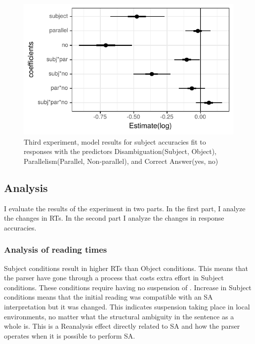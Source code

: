 \begin{knitrout}
\color{fgcolor}\begin{figure}[hbt!]

{\centering \includegraphics[]{experiments/equivalance/report/figure/exp3accuracymodel-1.pdf} 

}

\caption[Third experiment, model results for subject accuracies fit to responses with the predictors Disambiguation(Subject, Object), Parallelism(Parallel, Non-parallel), and Correct Answer(yes, no)]{Third experiment, model results for subject accuracies fit to responses with the predictors Disambiguation(Subject, Object), Parallelism(Parallel, Non-parallel), and Correct Answer(yes, no)}\label{fig:exp3accuracymodel}
\end{figure}


\end{knitrout}


\subsection{Analysis}

I evaluate the results of the experiment in two parts. In the first part, I analyze the changes in RTs. In the second part I analyze the changes in response accuracies. 

\subsubsection{Analysis of reading times}

Subject conditions result in higher RTs than Object conditions. This means that the parser have gone through a process that costs extra effort in Subject conditions. These conditions require having no suspension of {\Case}. Increase in Subject conditions means that the initial reading was compatible with an SA interpretation but it was changed. This indicates suspension taking place in local environments, no matter what the structural ambiguity in the sentence as a whole is. This is a Reanalysis effect directly related to SA and how the parser operates when it is possible to perform SA.

